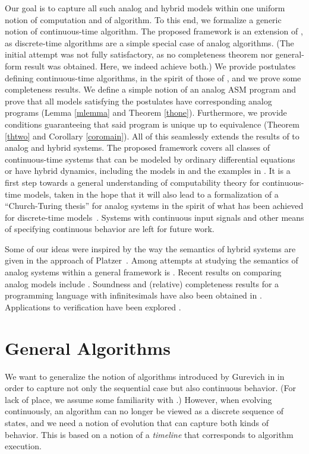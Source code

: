 \documentclass[envcountsame]{llncs}
\begin{document}
Our goal is to capture all such analog and hybrid models within one uniform notion of
computation and of algorithm.
To this end, we formalize a generic notion of
continuous-time algorithm. The proposed
framework is an extension of \cite{Gur00}, as discrete-time
algorithms are a simple special case of analog algorithms.
(The initial attempt \cite{BournezDF12} was not fully satisfactory, as no
completeness theorem nor general-form result was obtained. Here, we
indeed achieve both.)
We
provide postulates defining continuous-time algorithms, in the spirit of
  those of \cite{Gur00},
  and we
prove some completeness results.
We define a simple notion of an analog ASM
program and  prove that all models satisfying the postulates
have
  corresponding analog programs (Lemma
  \ref{mlemma} and Theorem \ref{thone}).
Furthermore, we provide  conditions guaranteeing that said program is unique up
to equivalence (Theorem \ref{thtwo} and Corollary
\ref{coromain}).
All of this seamlessly extends the
results of \cite{Gur00} to analog and hybrid systems.
The proposed framework  covers all classes of
continuous-time systems that can be modeled by ordinary differential
equations or have hybrid dynamics, including the models in \cite{Survey} and
 the examples in \cite{BournezDF12}. 
 It is a first step towards a general understanding of
computability theory for continuous-time models, taken in the hope that it will also lead to a
formalization of a ``Church-Turing thesis'' for analog systems in the spirit of what has been achieved for discrete-time models~\cite{BD,dershowitz2008natural,3P}.
Systems with continuous input signals
and other means of specifying continuous behavior are left for future
work.

Some of our ideas were inspired by the way the semantics
of hybrid systems are given in the approach of
Platzer~\cite{Platzer08}.
Among attempts at studying the semantics of analog systems  within a general
framework  is
\cite{TZ}. Recent results on comparing analog models include
\cite{fu2015models}. Soundness and (relative) completeness results for
a programming language with infinitesimals have also been obtained in
\cite{suenaga2011programming}. Applications to verification have  been
explored \cite{hasuo2012exercises}.



\section{General Algorithms}

We want to generalize the notion of algorithms introduced by Gurevich in \cite{Gur00} in
order to capture not only the sequential case but also continuous
behavior. (For lack of place, we assume some familiarity with
\cite{Gur00}.)
However, when evolving continuously, an algorithm can no longer be viewed as a discrete sequence of
states, and we need a notion of evolution that can capture both kinds of behavior. This
is based on a notion of a \emph{timeline}  that corresponds
to  algorithm execution.
\end{document}
